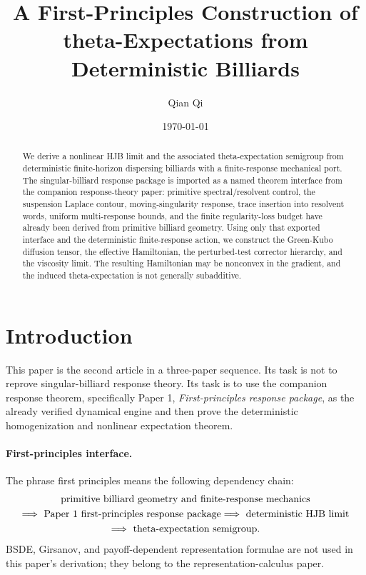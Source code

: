 \documentclass[11pt]{amsart}
\title[Deterministic Billiards and theta-Expectations]{A First-Principles Construction of theta-Expectations from Deterministic Billiards}
\author{Qian Qi}
\date{\today}
\theoremstyle{definition}
\theoremstyle{remark}
\newcommand{\PaperOne}[2]{Paper 1, \emph{#1}}
\begin{document}
\begin{abstract}
We derive a nonlinear HJB limit and the associated theta-expectation semigroup
from deterministic finite-horizon dispersing billiards with a finite-response
mechanical port.  The singular-billiard
response package is imported as a named theorem interface from the companion
response-theory paper: primitive spectral/resolvent control, the suspension
Laplace contour, moving-singularity response, trace insertion into resolvent
words, uniform multi-response bounds, and the finite regularity-loss budget have
already been derived from primitive billiard geometry.  Using only that exported
interface and the deterministic finite-response action, we construct the
Green-Kubo diffusion tensor, the effective Hamiltonian, the perturbed-test
corrector hierarchy, and the viscosity limit.  The resulting Hamiltonian may be
nonconvex in the gradient, and the induced theta-expectation is not generally
subadditive.
\end{abstract}

\maketitle

\section{Introduction}

This paper is the second article in a three-paper sequence.  Its task is not
to reprove singular-billiard response theory.  Its task is to use the companion
response theorem, specifically
\PaperOne{First-principles response package}{thm:main_response_package}, as the
already verified dynamical engine and then prove the deterministic
homogenization and nonlinear expectation theorem.

\paragraph{First-principles interface.}
The phrase first principles means the following dependency chain:
\begin{equation}
\begin{gathered}
\hbox{primitive billiard geometry and finite-response mechanics}\\
\Longrightarrow\ \hbox{Paper 1 first-principles response package}
\Longrightarrow\ \hbox{deterministic HJB limit}\\
\Longrightarrow\ \hbox{theta-expectation semigroup}.
\end{gathered}
\end{equation}
BSDE, Girsanov, and payoff-dependent representation formulae are not used in
this paper's derivation; they belong to the representation-calculus paper.
\end{document}
